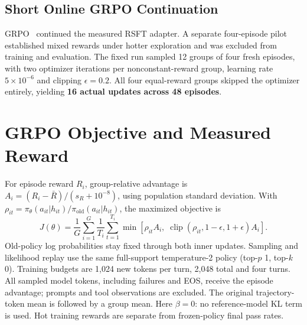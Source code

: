 \documentclass[10pt,journal,onecolumn,a4paper]{IEEEtran}
\begin{document}
\subsection{Short Online GRPO Continuation}
GRPO~\cite{grpo} continued the measured RSFT adapter. A separate four-episode pilot established mixed rewards under hotter exploration and was excluded from training and evaluation. The fixed run sampled 12 groups of four fresh episodes, with two optimizer iterations per nonconstant-reward group, learning rate $5\times10^{-6}$ and clipping $\epsilon=0.2$. All four equal-reward groups skipped the optimizer entirely, yielding \textbf{16 actual updates across 48 episodes}.

\section{GRPO Objective and Measured Reward}
For episode reward $R_i$, group-relative advantage is $A_i=(R_i-\bar R)/(s_R+10^{-8})$, using population standard deviation. With $\rho_{it}=\pi_\theta(a_{it}|h_{it})/\pi_{\mathrm{old}}(a_{it}|h_{it})$, the maximized objective is
\begin{equation}
J(\theta)=\frac{1}{G}\sum_{i=1}^{G}\frac{1}{T_i}\sum_{t=1}^{T_i}
\min\!\left[\rho_{it}A_i,\;\operatorname{clip}(\rho_{it},1-\epsilon,1+\epsilon)A_i\right].
\end{equation}
Old-policy log probabilities stay fixed through both inner updates. Sampling and likelihood replay use the same full-support temperature-2 policy (top-$p$ 1, top-$k$ 0). Training budgets are 1,024 new tokens per turn, 2,048 total and four turns. All sampled model tokens, including failures and EOS, receive the episode advantage; prompts and tool observations are excluded. The original trajectory-token mean is followed by a group mean. Here $\beta=0$: no reference-model KL term is used. Hot training rewards are separate from frozen-policy final pass rates.
\end{document}
